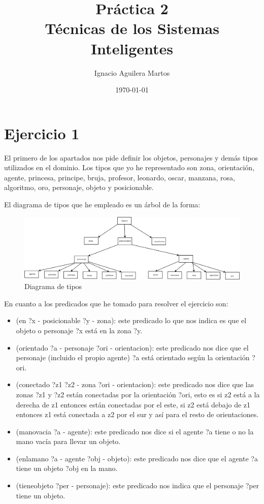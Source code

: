 \documentclass[12pt,a4paper]{article}
\author{Ignacio Aguilera Martos}
\title{Práctica 2 \\ Técnicas de los Sistemas Inteligentes}
\date{\today}
\begin{document}
	\maketitle

	\tableofcontents

	\newpage

\section{Ejercicio 1}

El primero de los apartados nos pide definir los objetos, personajes y demás tipos utilizados en el dominio. Los tipos que yo he representado son zona, orientación, agente, princesa, principe, bruja, profesor, leonardo, oscar, manzana, rosa, algoritmo, oro, personaje, objeto y posicionable.

El diagrama de tipos que he empleado es un árbol de la forma:

\begin{figure}[H]
	\centering
	\includegraphics[scale=0.32]{./Imagenes/diag-ej1.png}
	\caption{Diagrama de tipos}
\end{figure}

En cuanto a los predicados que he tomado para resolver el ejercicio son:

\begin{itemize}
	\item (en ?x - posicionable ?y - zona): este predicado lo que nos indica es que el objeto o personaje ?x está en la zona ?y.
	\item (orientado ?a - personaje ?ori - orientacion): este predicado nos dice que el personaje (incluido el propio agente) ?a está orientado según la orientación ?ori.
	\item (conectado ?z1 ?z2 - zona ?ori - orientacion): este predicado nos dice que las zonas ?z1 y ?z2 están conectadas por la orientación ?ori, esto es si z2 está a la derecha de z1 entonces están conectadas por el este, si z2 está debajo de z1 entonces z1 está conectada a z2 por el sur y así para el resto de orientaciones.
	\item (manovacia ?a - agente): este predicado nos dice si el agente ?a tiene o no la mano vacía para llevar un objeto.
	\item (enlamano ?a - agente ?obj - objeto): este predicado nos dice que el agente ?a tiene un objeto ?obj en la mano.
	\item (tieneobjeto ?per - personaje): este predicado nos indica que el personaje ?per tiene un objeto.
\end{itemize}
\end{document}
